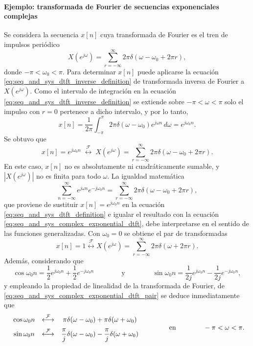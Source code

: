\documentclass[a4paper]{report}
\begin{document}
\paragraph{Ejemplo: transformada de Fourier de secuencias exponenciales complejas} Se considera la secuencia \(x[n]\) cuya transformada de Fourier es el tren de impulsos periódico
\begin{equation}\label{eq:seq_and_sys_complex_exponential_dtft}
 X(e^{j\omega})=\sum_{r=-\infty}^\infty2\pi\delta(\omega-\omega_0+2\pi r), 
\end{equation}
donde \(-\pi<\omega_0<\pi\). Para determinar \(x[n]\) puede aplicarse la ecuación \ref{eq:seq_and_sys_dtft_inverse_definition} de transformada inversa de Fourier a \(X(e^{j\omega})\). Como el intervalo de integración en la ecuación \ref{eq:seq_and_sys_dtft_inverse_definition} se extiende sobre \(-\pi<\omega<\pi\) solo el impulso con \(r=0\) pertenece a dicho intervalo, y por lo tanto,
\[
 x[n]=\frac{1}{2\pi}\int_{-\pi}^\pi2\pi\delta(\omega-\omega_0)e^{j\omega n}\,d\omega=e^{j\omega_0n}.
\]
Se obtuvo que 
\begin{equation}\label{eq:seq_and_sys_complex_exponential_dtft_pair}
 x[n]=e^{j\omega_0n}\;\overset{\mathcal{F}}{\longleftrightarrow}\;X(e^{j\omega})=\sum_{r=-\infty}^\infty2\pi\delta(\omega-\omega_0+2\pi r). 
\end{equation}
En este caso, \(x[n]\) no es absolutamente ni cuadráticamente sumable, y \(|X(e^{j\omega})|\) no es finita para todo \(\omega\). La igualdad matemática  
\[
 \sum_{n=-\infty}^\infty e^{j\omega n}e^{-j\omega_0n}=\sum_{r=-\infty}^\infty2\pi\delta(\omega-\omega_0+2\pi r),
\]
que proviene de sustituir \(x[n]=e^{j\omega_0n}\) en la ecuación \ref{eq:seq_and_sys_dtft_definition} e igualar el resultado con la ecuación \ref{eq:seq_and_sys_complex_exponential_dtft}, debe interpretarse en el sentido de las funciones generalizadas. Con \(\omega_0=0\) se obtiene el par de transformadas
\begin{equation}\label{eq:seq_and_sys_constant_dtft_pair}
 x[n]=1\overset{\mathcal{F}}{\longleftrightarrow}X(e^{j\omega})=\sum_{r=-\infty}^\infty2\pi\delta(\omega+2\pi r). 
\end{equation} 
Además, considerando que 
\[
 \cos\omega_0n=\frac{1}{2}e^{j\omega_0n}+\frac{1}{2}e^{-j\omega_0n}
  \qquad\qquad\textrm{y}\qquad\qquad
 \sin\omega_0n=\frac{1}{2j}e^{j\omega_0n}-\frac{1}{2j}e^{-j\omega_0n},
\]
y empleando la propiedad de linealidad de la transformada de Fourier, de \ref{eq:seq_and_sys_complex_exponential_dtft_pair} se deduce inmediatamente que
\begin{equation}\label{eq:seq_and_sys_sin_cos_dtft_pair}
\begin{array}{ccc}
 \cos\omega_0n&\overset{\mathcal{F}}{\longleftrightarrow}&\pi\delta(\omega-\omega_0)+\pi\delta(\omega+\omega_0)\\[\medskipamount]
 \sin\omega_0n&\overset{\mathcal{F}}{\longleftrightarrow}&\dfrac{\pi}{j}\delta(\omega-\omega_0)-\dfrac{\pi}{j}\delta(\omega+\omega_0)
\end{array}
\qquad\qquad\textrm{en}\qquad\qquad
 -\pi<\omega<\pi.
\end{equation}
 
\end{document}
